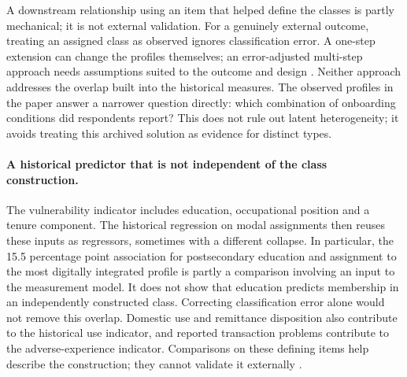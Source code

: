 A downstream relationship using an item that helped define the classes is partly mechanical; it is not external validation. For a genuinely external outcome, treating an assigned class as observed ignores classification error. A one-step extension can change the profiles themselves; an error-adjusted multi-step approach needs assumptions suited to the outcome and design \citep{vermunt2010}. Neither approach addresses the overlap built into the historical measures. The observed profiles in the paper answer a narrower question directly: which combination of onboarding conditions did respondents report? This does not rule out latent heterogeneity; it avoids treating this archived solution as evidence for distinct types.
\paragraph{A historical predictor that is not independent of the class construction.}
The vulnerability indicator includes education, occupational position and a tenure component. The historical regression on modal assignments then reuses these inputs as regressors, sometimes with a different collapse. In particular, the 15.5 percentage point association for postsecondary education and assignment to the most digitally integrated profile is partly a comparison involving an input to the measurement model. It does not show that education predicts membership in an independently constructed class. Correcting classification error alone would not remove this overlap. Domestic use and remittance disposition also contribute to the historical use indicator, and reported transaction problems contribute to the adverse-experience indicator. Comparisons on these defining items help describe the construction; they cannot validate it externally \citep{bakkKuha2021}.
